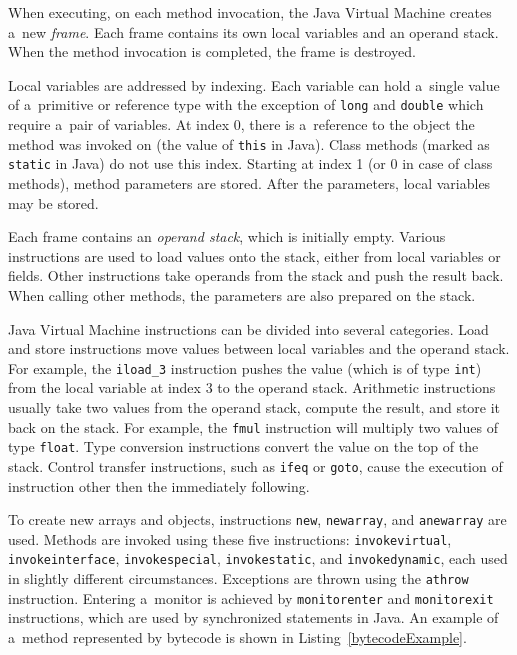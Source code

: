 When executing, on each method invocation, the Java Virtual Machine creates
a~new \emph{frame}. Each frame contains its own local variables and an operand
stack. When the method invocation is completed, the frame is destroyed.

Local variables are addressed by indexing. Each variable can hold a~single value
of a~primitive or reference type with the exception of \texttt{long} and
\texttt{double} which require a~pair of variables. At index 0, there is
a~reference to the object the method was invoked on (the value of \texttt{this}
in Java). Class methods (marked as \texttt{static} in Java) do not use this
index.  Starting at index 1 (or 0 in case of class methods), method parameters
are stored. After the parameters, local variables may be stored.

Each frame contains an \emph{operand stack}, which is initially empty. Various
instructions are used to load values onto the stack, either from local variables
or fields. Other instructions take operands from the stack and push the result
back. When calling other methods, the parameters are also prepared on the stack.

Java Virtual Machine instructions can be divided into several categories. Load
and store instructions move values between local variables and the operand
stack. For example, the \texttt{iload\_3} instruction pushes the value (which is
of type \texttt{int}) from the local variable at index 3 to the operand stack.
Arithmetic instructions usually take two values from the operand stack, compute
the result, and store it back on the stack. For example, the \texttt{fmul}
instruction will multiply two values of type \texttt{float}. Type conversion
instructions convert the value on the top of the stack. Control transfer
instructions, such as \texttt{ifeq} or \texttt{goto}, cause the execution of
instruction other then the immediately following.

To create new arrays and objects, instructions \texttt{new}, \texttt{newarray},
and \texttt{anewarray} are used. Methods are invoked using these five
instructions: \texttt{invokevirtual}, \texttt{invokeinterface},
\texttt{invokespecial}, \texttt{invokestatic}, and \texttt{invokedynamic}, each
used in slightly different circumstances. Exceptions are thrown using the
\texttt{athrow} instruction. Entering a~monitor is achieved by
\texttt{monitorenter} and \texttt{monitorexit} instructions, which are used by
synchronized statements in Java. An example of a~method represented by bytecode
is shown in Listing~\ref{bytecodeExample}.

